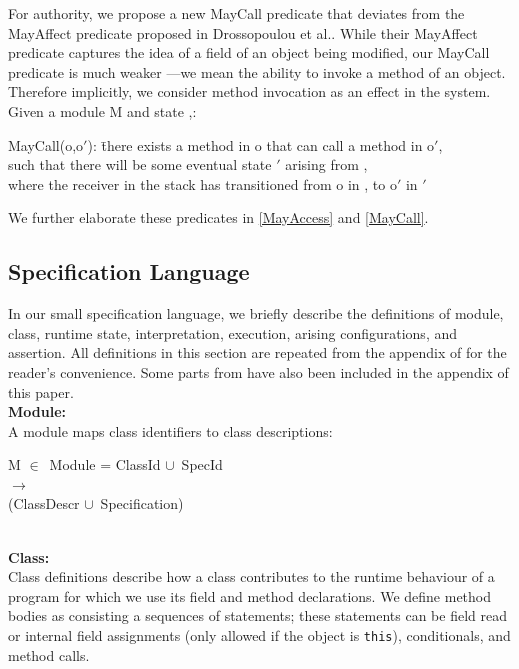 \documentclass[a4paper,11pt,twoside]{article}
\newenvironment{logic}
{\begin{minipage}[c]{\linewidth}  \sffamily \mdseries \begin{tabbing}}
{\end{tabbing}\end{minipage}\vspace{0.3em}}
\newcommand{\loin}{$\in$}
\newcommand{\losigma}{\text{$\upsigma$}}
\newcommand{\locup} {$\cup$}
\newcommand{\ablock} {\null\qquad}
\begin{document}
For authority, we propose a new MayCall predicate that deviates from the MayAffect predicate proposed in Drossopoulou et al.\cite{drossopoulou2016}. While their MayAffect predicate captures the idea of a field of an object being modified, our MayCall predicate is much weaker ---we mean the ability to invoke a method of an object. Therefore implicitly, we consider method invocation as an effect in the system. Given a module M and state \losigma,:
\begin{tabbing}
MayCall(o,o$'$): \=there exists a method in o that can call a method in o$'$,\\ \> such that there will be some eventual state \losigma$'$ arising from \losigma,\\ \> where the receiver in the stack has transitioned from o in \losigma, to o$'$ in \losigma$'$\\
\end{tabbing}

We further elaborate these predicates in \cref{MayAccess} and \cref{MayCall}.
\subsection{Specification Language}\label{sec:speclang}
In our small specification language, we briefly describe the definitions of module, class, runtime state, interpretation, execution, arising configurations, and assertion. All definitions in this section are repeated from the appendix of \cite{drossopoulou2015b} for the reader's convenience. Some parts from \cite{drossopoulou2015b} have also been included in the appendix of this paper. \\

\textbf{Module:}\\
A module maps class identifiers to class descriptions:\\
\begin{logic}
M \loin\ Module = ClassId \locup\ SpecId\\\ablock\qquad\qquad\quad $\rightarrow$ \\
\ablock \qquad \qquad \quad (ClassDescr \locup\ Specification)
\end{logic}\\

\textbf{Class:}\\
Class definitions describe how a class contributes to the runtime behaviour of a program for which we use its field and method declarations. We define method bodies as consisting a sequences of statements; these statements can be field read or internal field assignments (only allowed if the object is \texttt{this}), conditionals, and method calls.\\
\end{document}
